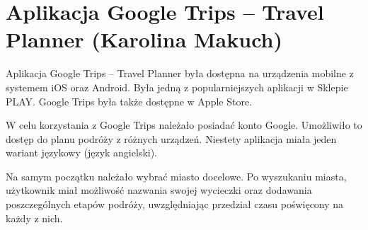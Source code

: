 \documentclass[10pt,twoside,a4paper]{report}
\begin{document}
\section{Aplikacja Google Trips -- Travel Planner (Karolina Makuch)}

\par Aplikacja Google Trips – Travel Planner była dostępna na urządzenia mobilne z systemem iOS oraz Android. Była jedną z popularniejszych aplikacji w Sklepie PLAY. Google Trips była także dostępne w Apple Store. 
\par W celu korzystania z Google Trips należało posiadać konto Google. Umożliwiło to dostęp do planu podróży z różnych urządzeń. Niestety aplikacja miała jeden wariant językowy (język angielski).
\par Na samym początku należało wybrać miasto docelowe. Po wyszukaniu miasta, użytkownik miał możliwość nazwania swojej wycieczki oraz dodawania poszczególnych etapów podróży, uwzględniając przedział czasu poświęcony na każdy z nich.
\end{document}
